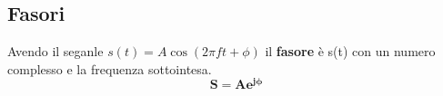 \subsection{Fasori}
Avendo il seganle $s(t) = A \cos(2\pi ft + \phi)$ il \textbf{fasore} è s(t) con un numero complesso e la frequenza sottointesa.
\begin{equation*}
	\mathbf{S = Ae^{j\phi}}
\end{equation*}
